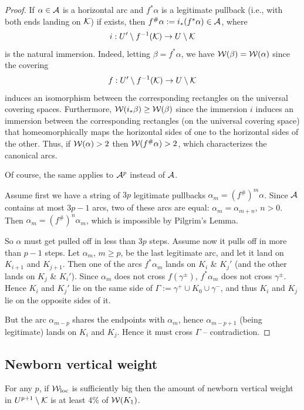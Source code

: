 \begin{proof}
  If $\alpha\in {\mathcal A}$ is a horizontal arc and $f^* \alpha$ is a legitimate pullback (i.e., with both ends landing on ${\mathcal K}$)
if exists, then $f^\#\alpha:= i_* (f^*\alpha)\in {\mathcal A}$, where 
$$
    i: U'\setminus f^{-1}({\mathcal K}) \rightarrow U\setminus {\mathcal K}
$$
is the natural immersion. 
Indeed,  letting $\beta=f^* \alpha$, we have $ {\mathcal W}(\beta) = {\mathcal W}(\alpha) $  
since the covering 
$$
   f:  U' \setminus f^{-1}({\mathcal K}) \rightarrow U \setminus {\mathcal K} 
$$
induces an isomorphism between  the corresponding rectangles on the universal covering spaces. 
Furthermore, ${\mathcal W}(i_* \beta)\geq  {\mathcal W}(\beta)$ since the immersion $i$ induces an immersion between
the corresponding rectangles (on the universal covering space)
 that homeomorphically maps the horizontal sides of one to the
horizontal sides of the other. Thus, if ${\mathcal W}(\alpha) > 2$ then ${\mathcal W}(f^\# \alpha) >2$,
which characterizes the canonical arcs. 

Of course, the same applies to ${\mathcal A}^p$ instead of ${\mathcal A}$.  

Assume first we have a string of $3p$ legitimate pullbacks  $\alpha_m= (f^\#)^m \alpha$. 
Since ${\mathcal A}$ contains at most $3p-1$ arcs, two of these arcs are equal: $\alpha_m= \alpha_{m+n}$, $n>0$.
Then $\alpha_m =  (f^\#)^n \alpha_m$, which is impossible by Pilgrim's Lemma.   

So $\alpha$ must get pulled off in less than $3p$ steps. Assume now it pulls off in more than $p-1$ steps. 
Let $\alpha_m$, $m\geq p$,   be the last legitimate arc, and  let it land on $K_{i+1}$ and $K_{j+1}$. 
Then one of the arcs $f^* \alpha_m$ lands on $K_i$ \& $K_j'$ (and the other lands on  $K_j$ \& $K_i'$). 
Since $\alpha_m$ does not cross $f(\gamma^\pm)$, $f^*\alpha_m$ does not cross $\gamma^\pm$. 
Hence $K_i$ and $K_j'$ lie on the same side of $\Gamma:= \gamma^+\cup K_0\cup \gamma^-$,
and thus $K_i$ and $K_j$ lie on the opposite sides of it.  

But the arc $\alpha_{m-p}$ shares  the endpoints  with  $\alpha_m$, 
hence $\alpha_{m-p+1}$ (being legitimate) lands on $K_i$ and $K_j$. 
Hence it must cross $\Gamma$ -- contradiction.    
\end{proof}

\subsection{Newborn vertical weight}


\begin{lem}\label{def vert}
For any $p$, if ${\mathcal W}_{\mathrm{loc}}$ is sufficiently big then 
the amount of newborn vertical weight in $U^{p+1}\setminus {\mathcal K}$ is at least 4\% of ${\mathcal W}(K_1)$. 
\end{lem}

